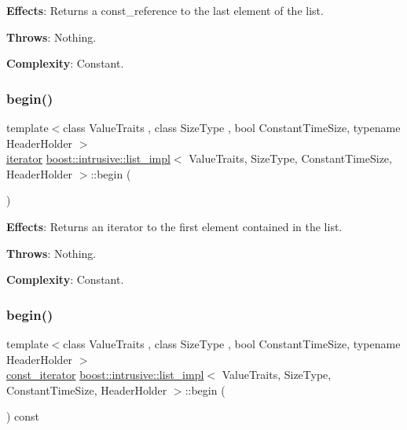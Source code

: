 {\bfseries Effects}\+: Returns a const\+\_\+reference to the last element of the list.

{\bfseries Throws}\+: Nothing.

{\bfseries Complexity}\+: Constant. \mbox{\label{classboost_1_1intrusive_1_1list__impl_acc6da960285b2ff0f37e1f373a767e19}} 
\subsubsection{\texorpdfstring{begin()}{begin()}\hspace{0.1cm}{\footnotesize\ttfamily [1/2]}}
{\footnotesize\ttfamily template$<$class Value\+Traits , class Size\+Type , bool Constant\+Time\+Size, typename Header\+Holder $>$ \\
\hyperlink{classboost_1_1intrusive_1_1list__impl_a15c0189bf62eb9fb98bc07ef10b8cb23}{iterator} \hyperlink{classboost_1_1intrusive_1_1list__impl}{boost\+::intrusive\+::list\+\_\+impl}$<$ Value\+Traits, Size\+Type, Constant\+Time\+Size, Header\+Holder $>$\+::begin (\begin{DoxyParamCaption}{ }\end{DoxyParamCaption})\hspace{0.3cm}{\ttfamily [inline]}}

{\bfseries Effects}\+: Returns an iterator to the first element contained in the list.

{\bfseries Throws}\+: Nothing.

{\bfseries Complexity}\+: Constant. \mbox{\label{classboost_1_1intrusive_1_1list__impl_a049277a05485ff97f95ff4d778c5551d}} 
\subsubsection{\texorpdfstring{begin()}{begin()}\hspace{0.1cm}{\footnotesize\ttfamily [2/2]}}
{\footnotesize\ttfamily template$<$class Value\+Traits , class Size\+Type , bool Constant\+Time\+Size, typename Header\+Holder $>$ \\
\hyperlink{classboost_1_1intrusive_1_1list__impl_af4ced710fe02662c5650d161af83d8cd}{const\+\_\+iterator} \hyperlink{classboost_1_1intrusive_1_1list__impl}{boost\+::intrusive\+::list\+\_\+impl}$<$ Value\+Traits, Size\+Type, Constant\+Time\+Size, Header\+Holder $>$\+::begin (\begin{DoxyParamCaption}{ }\end{DoxyParamCaption}) const\hspace{0.3cm}{\ttfamily [inline]}}

